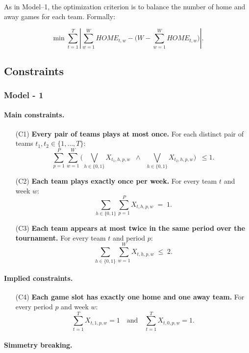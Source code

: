 \documentclass{article}
\begin{document}
As in Model--1, the optimization criterion is to balance the number of
home and away games for each team. Formally:

\[
\min \sum_{t=1}^T \left| \sum_{w=1}^W HOME_{t,w}
      - \Big(W - \sum_{w=1}^W HOME_{t,w}\Big) \right|.
\]


\subsection{Constraints}

\subsubsection{Model - 1 }

\paragraph{Main constraints.}

\begin{itemize}
\item[(C1)] \textbf{Every pair of teams plays at most once.}  
For each distinct pair of teams $t_1,t_2 \in \{1,\dots,T\}$:
\[
\sum_{p=1}^{P}\sum_{w=1}^{W}
\Big( \bigvee_{h\in\{0,1\}} X_{t_1,h,p,w} \;\;\land\;\;
       \bigvee_{h\in\{0,1\}} X_{t_2,h,p,w} \Big)
\;\;\leq 1.
\]

\item[(C2)] \textbf{Each team plays exactly once per week.}  
For every team $t$ and week $w$:
\[
\sum_{h\in\{0,1\}}\sum_{p=1}^{P} X_{t,h,p,w} \;=\; 1.
\]

\item[(C3)] \textbf{Each team appears at most twice in the same period over the tournament.}  
For every team $t$ and period $p$:
\[
\sum_{h\in\{0,1\}}\sum_{w=1}^{W} X_{t,h,p,w} \;\leq\; 2.
\]
\end{itemize}

\paragraph{Implied constraints.}

\begin{itemize}
\item[(C4)] \textbf{Each game slot has exactly one home and one away team.}  
For every period $p$ and week $w$:
\[
\sum_{t=1}^{T} X_{t,1,p,w} = 1
\quad\text{and}\quad
\sum_{t=1}^{T} X_{t,0,p,w} = 1.
\]
\end{itemize}

\paragraph{Simmetry breaking.}
\end{document}

